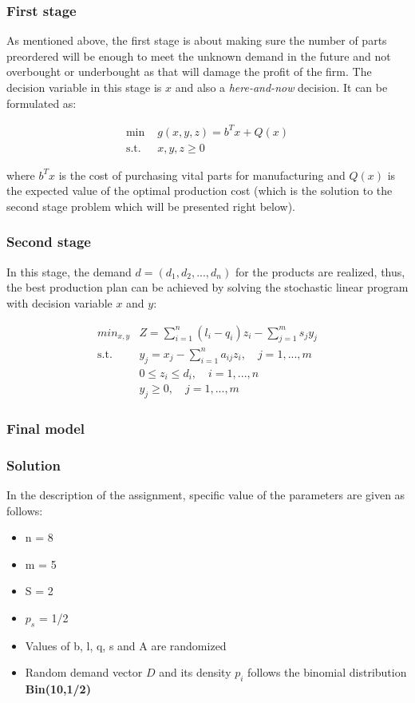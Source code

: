 		\subsubsection{First stage}
		\qquad As mentioned above, the first stage is about making sure the number of parts preordered will be enough to meet the unknown demand in the future and not overbought or underbought as that will damage the profit of the firm. The decision variable in this stage is $x$ and also a \textit{here-and-now} decision. It can be formulated as:

		\begin{align*}
			\text{min } & g(x,y,z) = b^Tx + Q(x)\\
			\text{s.t. } & x,y,z \geq 0
		\end{align*}

		where $b^Tx$ is the cost of purchasing vital parts for manufacturing and $Q(x)$ is the expected value of the optimal production cost (which is the solution to the second stage problem which will be presented right below).

		\subsubsection{Second stage}

		\qquad In this stage, the demand $d=(d_1,d_2,...,d_n)$ for the products are realized, thus, the best production plan can be achieved by solving the stochastic linear program with decision variable $x$ and $y$:

		\begin{align*}
			min_{x,y} & Z=\sum^n_{i=1} (l_i-q_i)z_i - \sum^m_{j=1}s_jy_j \\
			\text{s.t. } & y_j=x_j- \sum_{i=1}^n a_{ij}z_i, \quad j=1,...,m \\
			& 0 \leq z_i \leq d_i, \quad i=1,...,n \\
			& y_j \geq 0, \quad j=1,...,m
		\end{align*}
		
		\subsubsection{Final model}
		\subsubsection{Solution}

		\qquad In the description of the assignment, specific value of the parameters are given as follows:

		\begin{itemize}
			\item n = 8
			\item m = 5
			\item S = 2
			\item $p_s$ = 1/2
			\item Values of b, l, q, s and A are randomized 
			\item Random demand vector $D$ and its density $p_i$ follows the binomial distribution \textbf{Bin(10,1/2)}
		\end{itemize}


		

